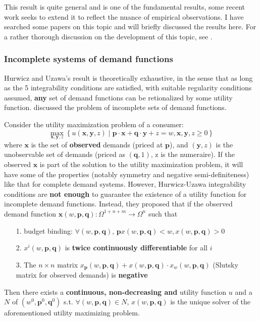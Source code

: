 This result is quite general and is one of the fundamental results, some recent work seeks to extend it to reflect the nuance of empirical observations. I have searched some papers on this topic and will briefly discussed the results here. For a rather thorough discussion on the development of this topic, see \citet*{hands2006integrability}.

\subsubsection*{Incomplete systems of demand functions}
Hurwicz and Uzawa's result is theoretically exhaustive, in the sense that as long as the 5 integrability conditions are satisfied, with suitable regularity conditions assumed, \textbf{any} set of demand functions can be retionalized by some utility function. \cite{epstein1982integrability} discussed the problem of incomplete sets of demand functions.

Consider the utility maximization problem of a consumer:
$$
\max_{\mathbf{x},\mathbf{y},z} \left\{ u(\mathbf{x},\mathbf{y},z)\mid \mathbf{p}\cdot\mathbf{x}+\mathbf{q}\cdot \mathbf{y} + z =w, \mathbf{x},\mathbf{y},z\geq 0 \right\}
$$
where $\mathbf{x}$ is the set of \textbf{observed} demands (priced at $\mathbf{p}$), and $\left(\mathbf{y},z\right)$ is the unobservable set of demands (priced as $(\mathbf{q},1)$, z is the numeraire). If the observed $\mathbf{x}$ is part of the solution to the utility maximization problem, it will have some of the properties (notably symmetry and negative semi-definiteness) like that for complete demand systems. However, Hurwicz-Uzawa integrability conditions are \textbf{not enough} to guarantee the
existence of a utility function for incomplete demand functions. Instead, they proposed that if the observed demand function $\mathbf{x}(w,\mathbf{p},\mathbf{q}): \Omega^{1+n+m}\rightarrow \Omega^n$ such that 
\begin{enumerate}
    \item[1.] budget binding: $\forall (w,\mathbf{p},\mathbf{q})$, $\mathbf{p}x(w,\mathbf{p},\mathbf{q})<w,x(w,\mathbf{p},\mathbf{q})>0$
    \item[2.] $x^i(w,\mathbf{p},\mathbf{q})$ is \textbf{twice continuously differentiable} for all $i$
    \item[3.] The $n\times n$ matrix $x_{\mathbf{p}}(w,\mathbf{p},\mathbf{q}) + x(w,\mathbf{p},\mathbf{q})\cdot x_w (w,\mathbf{p},\mathbf{q})$ (Slutsky matrix for observed demands) is \textbf{negative }
\end{enumerate}
Then there exists a \textbf{continuous, non-decreasing and } utility function $u$ and a  $N$ of $(w^0,\mathbf{p}^0,\mathbf{q}^0)$ s.t. $\forall (w,\mathbf{p},\mathbf{q})\in N$, $x(w,\mathbf{p},\mathbf{q})$ is the unique solver of the aforementioned utility maximizing problem.

